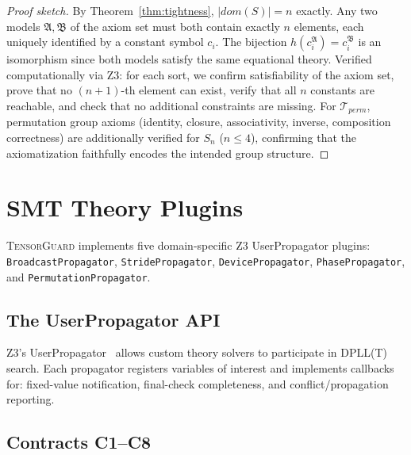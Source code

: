 \documentclass[11pt]{article}
\begin{document}
\begin{proof}[Proof sketch]
By Theorem~\ref{thm:tightness}, $|\mathit{dom}(S)| = n$ exactly.
Any two models $\mathfrak{A}, \mathfrak{B}$ of the axiom set must
both contain exactly $n$ elements, each uniquely identified by a
constant symbol $c_i$.  The bijection $h(c_i^{\mathfrak{A}}) = c_i^{\mathfrak{B}}$
is an isomorphism since both models satisfy the same equational theory.
Verified computationally via Z3: for each sort, we confirm satisfiability
of the axiom set, prove that no $(n+1)$-th element can exist,
verify that all $n$ constants are reachable, and check that
no additional constraints are missing.
For $\mathcal{T}_{\mathit{perm}}$, permutation group axioms
(identity, closure, associativity, inverse, composition correctness)
are additionally verified for $S_n$ ($n \leq 4$), confirming that
the axiomatization faithfully encodes the intended group structure.
\end{proof}


\section{SMT Theory Plugins}\label{sec:propagators}

\textsc{TensorGuard} implements five domain-specific Z3
UserPropagator plugins: \texttt{BroadcastPropagator},
\texttt{StridePropagator}, \texttt{DevicePropagator},
\texttt{PhasePropagator}, and \texttt{PermutationPropagator}.

\subsection{The UserPropagator API}

Z3's UserPropagator~\cite{z3userprop} allows custom theory
solvers to participate in DPLL(T) search.  Each propagator
registers variables of interest and implements callbacks for:
fixed-value notification, final-check completeness, and
conflict/propagation reporting.

\subsection{Contracts C1--C8}
\end{document}

